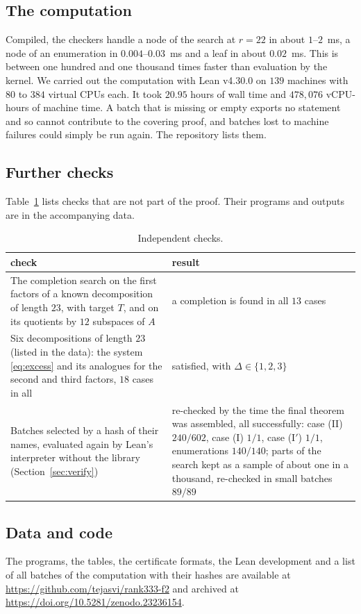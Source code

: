 \documentclass[11pt]{amsart}
\theoremstyle{definition}
\theoremstyle{remark}
\numberwithin{equation}{section}
\begin{document}
\subsection{The computation}
Compiled, the checkers handle a node of the search at $r=22$ in about $1$--$2$~ms, a node of an enumeration in $0.004$--$0.03$~ms and a leaf in about $0.02$~ms. This is between one hundred and one thousand times faster than evaluation by the kernel. We carried out the computation with Lean v4.30.0 on $139$ machines with $80$ to $384$ virtual CPUs each. It took $20.95$ hours of wall time and $478{,}076$ vCPU-hours of machine time. A batch that is missing or empty exports no statement and so cannot contribute to the covering proof, and batches lost to machine failures could simply be run again. The repository lists them.

\subsection{Further checks}
Table~\ref{tab:checks} lists checks that are not part of the proof. Their programs and outputs are in the accompanying data.

\begin{table}[ht]
\caption{Independent checks.}\label{tab:checks}
\centering
\begin{tabular}{@{}p{}p{}@{}}
\toprule
check & result\\
\midrule
The completion search on the first factors of a known decomposition of length $23$, with target $T$, and on its quotients by $12$ subspaces of $A$ & a completion is found in all $13$ cases\\
Six decompositions of length $23$ (listed in the data): the system \eqref{eq:excess} and its analogues for the second and third factors, $18$ cases in all & satisfied, with $\Delta\in\{1,2,3\}$\\
Batches selected by a hash of their names, evaluated again by Lean's interpreter without the library (Section~\ref{sec:verify}) & re-checked by the time the final theorem was assembled, all successfully: case (II) $240/602$, case (I) $1/1$, case (I$'$) $1/1$, enumerations $140/140$; parts of the search kept as a sample of about one in a thousand, re-checked in small batches $89/89$\\
\bottomrule
\end{tabular}
\end{table}

\subsection{Data and code}
The programs, the tables, the certificate formats, the Lean development and a list of all batches of the computation with their hashes are available at \url{https://github.com/tejasvi/rank333-f2} and archived at \url{https://doi.org/10.5281/zenodo.23236154}.
\end{document}
